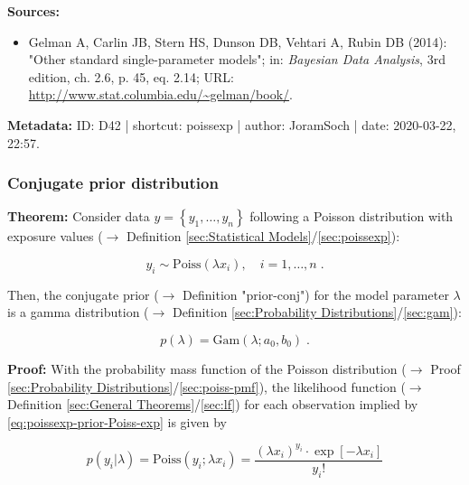 \documentclass[a4paper,12pt,twoside]{book}
\begin{document}
\vspace{1em}
\textbf{Sources:}
\begin{itemize}
\item Gelman A, Carlin JB, Stern HS, Dunson DB, Vehtari A, Rubin DB (2014): "Other standard single-parameter models"; in: \textit{Bayesian Data Analysis}, 3rd edition, ch. 2.6, p. 45, eq. 2.14; URL: \url{http://www.stat.columbia.edu/~gelman/book/}.
\end{itemize}


\vspace{1em}
\textbf{Metadata:} ID: D42 | shortcut: poissexp | author: JoramSoch | date: 2020-03-22, 22:57.
\vspace{1em}



\subsubsection[\textbf{Conjugate prior distribution}]{Conjugate prior distribution} \label{sec:poissexp-prior}
\setcounter{equation}{0}

\textbf{Theorem:} Consider data $y = \left\lbrace y_1, \ldots, y_n \right\rbrace$ following a Poisson distribution with exposure values ($\rightarrow$ Definition \ref{sec:Statistical Models}/\ref{sec:poissexp}):

\begin{equation} \label{eq:poissexp-prior-Poiss-exp}
y_i \sim \mathrm{Poiss}(\lambda x_i), \quad i = 1, \ldots, n \; .
\end{equation}

Then, the conjugate prior ($\rightarrow$ Definition "prior-conj") for the model parameter $\lambda$ is a gamma distribution ($\rightarrow$ Definition \ref{sec:Probability Distributions}/\ref{sec:gam}):

\begin{equation} \label{eq:poissexp-prior-Poiss-exp-prior}
p(\lambda) = \mathrm{Gam}(\lambda; a_0, b_0) \; .
\end{equation}


\vspace{1em}
\textbf{Proof:} With the probability mass function of the Poisson distribution ($\rightarrow$ Proof \ref{sec:Probability Distributions}/\ref{sec:poiss-pmf}), the likelihood function ($\rightarrow$ Definition \ref{sec:General Theorems}/\ref{sec:lf}) for each observation implied by \eqref{eq:poissexp-prior-Poiss-exp} is given by

\begin{equation} \label{eq:poissexp-prior-Poiss-exp-LF-s1}
p(y_i|\lambda) = \mathrm{Poiss}(y_i; \lambda x_i) = \frac{(\lambda x_i)^{y_i} \cdot \exp\left[-\lambda x_i\right]}{y_i !}
\end{equation}
\end{document}

